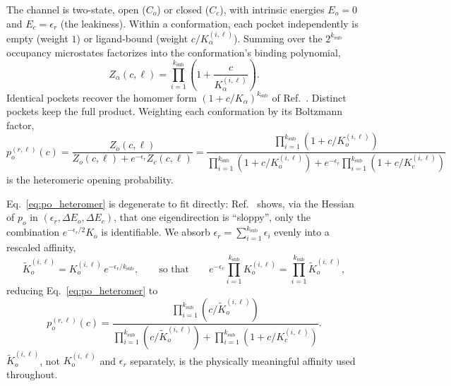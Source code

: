 \documentclass[aps,pre,superscriptaddress,floatfix,longbibliography,linenumbers]{revtex4-2}
\begin{document}
The channel is two-state, open ($C_o$) or closed ($C_c$), with intrinsic
energies $E_o=0$ and $E_c=\epsilon_r$ (the leakiness). Within a conformation,
each pocket independently is empty (weight $1$) or ligand-bound (weight
$c/K_\alpha^{(i,\ell)}$). Summing over the $2^{k_\text{sub}}$ occupancy
microstates factorizes into the conformation's binding polynomial,
\begin{equation}
Z_\alpha(c,\ell) = \prod_{i=1}^{k_\text{sub}}\left(1+\frac{c}{K_\alpha^{(i,\ell)}}\right).
\label{eq:binding_poly}
\end{equation}
Identical pockets recover the homomer form $(1+c/K_\alpha)^{k_\text{sub}}$ of
Ref.~\cite{einav_monod-wyman-changeux_2017}. Distinct pockets keep the full
product. Weighting each conformation by its Boltzmann factor,
\begin{equation}
p_o^{(r,\ell)}(c) = \frac{Z_o(c,\ell)}{Z_o(c,\ell) + e^{-\epsilon_r} Z_c(c,\ell)}
= \frac{\prod_{i=1}^{k_\text{sub}} (1+c/K_o^{(i,\ell)})}{\prod_{i=1}^{k_\text{sub}} (1+c/K_o^{(i,\ell)}) + e^{-\epsilon_r}\prod_{i=1}^{k_\text{sub}}(1+c/K_c^{(i,\ell)})}
\label{eq:po_heteromer}
\end{equation}
is the heteromeric opening probability.

Eq.~\eqref{eq:po_heteromer} is degenerate to fit directly:
Ref.~\cite{einav_monod-wyman-changeux_2017} shows, via the Hessian of $p_o$
in $(\epsilon_r,\Delta E_o,\Delta E_c)$, that one eigendirection is
``sloppy'', only the combination $e^{-\epsilon_r/2}K_o$ is identifiable. We
absorb $\epsilon_r=\sum_{i=1}^{k_\text{sub}}\epsilon_i$ evenly into a rescaled
affinity,
\begin{equation}
\tilde K_o^{(i,\ell)} = K_o^{(i,\ell)}\, e^{-\epsilon_r/k_\text{sub}},
\qquad\text{so that}\qquad
e^{-\epsilon_r}\prod_{i=1}^{k_\text{sub}} K_o^{(i,\ell)} = \prod_{i=1}^{k_\text{sub}} \tilde K_o^{(i,\ell)},
\label{eq:Ko_tilde}
\end{equation}
reducing Eq.~\eqref{eq:po_heteromer} to
\begin{equation}
p_o^{(r,\ell)}(c) = \frac{\prod_{i=1}^{k_\text{sub}} (c/\tilde K_o^{(i,\ell)})}{\prod_{i=1}^{k_\text{sub}}(c/\tilde K_o^{(i,\ell)}) + \prod_{i=1}^{k_\text{sub}}(1+c/K_c^{(i,\ell)})}.
\label{eq:po_rescaled}
\end{equation}
$\tilde K_o^{(i,\ell)}$, not $K_o^{(i,\ell)}$ and $\epsilon_r$ separately, is
the physically meaningful affinity used throughout.
\end{document}

